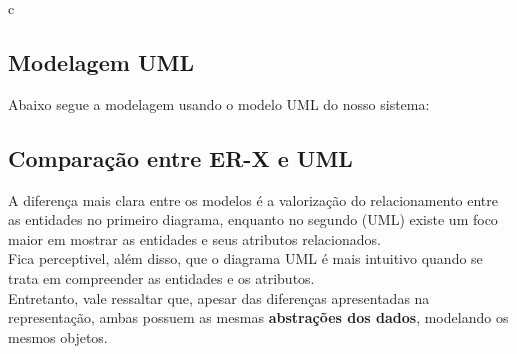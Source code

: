 c\documentclass{article}
\begin{document}
	\subsection{Modelagem UML}
	Abaixo segue a modelagem usando o modelo UML do nosso sistema:\\

	\subsection{Comparação entre ER-X e UML}
	A diferença mais clara entre os modelos é a valorização do relacionamento entre as entidades no primeiro diagrama, enquanto no segundo (UML) existe um foco maior em mostrar as entidades e seus atributos relacionados.\\
	Fica perceptivel, além disso, que o diagrama UML é mais intuitivo quando se trata em compreender as entidades e os atributos. \\
	Entretanto, vale ressaltar que, apesar das diferenças apresentadas na representação, ambas possuem as mesmas \textbf{abstrações dos dados}, modelando os mesmos objetos.
\end{document}
